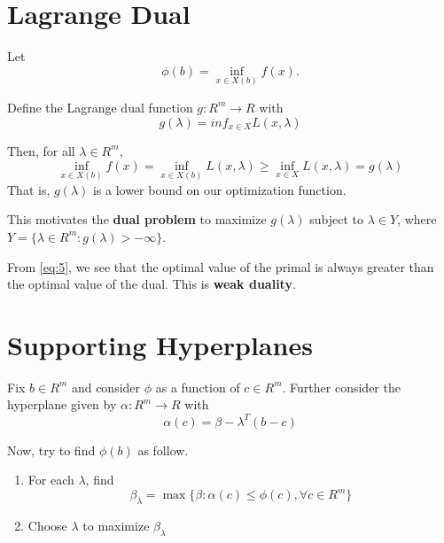 \section{Lagrange Dual}
\label{sec:lagrange-dual}

\begin{defn}
  \label{defn:3}

  Let
  \begin{equation}
    \label{eq:6}
    \phi(b) = \inf_{x \in X(b)} f(x).
  \end{equation}

  Define the Lagrange dual function $g: R^{m} \rightarrow R$ with
  \begin{equation}
    \label{eq:4}
    g(\lambda) = inf_{x \in X} L(x, \lambda)
  \end{equation}
  
  Then, for all $\lambda \in R^{m}$,
  \begin{equation}
    \label{eq:5}
    \inf_{x \in X(b)} f(x) = \inf_{x \in X(b)} L(x, \lambda) \geq
    \inf_{x \in X} L(x, \lambda) = g(\lambda)
  \end{equation} That is, $g(\lambda)$ is a lower bound on our
  optimization function.
\end{defn}

This motivates the \textbf{dual problem} to maximize $g(\lambda)$ subject to
$\lambda \in Y$, where $Y = \{ \lambda \in R^{m} : g(\lambda) >
-\infty \}$.

\begin{thm}[Duality]
  From \eqref{eq:5}, we see that the optimal value of the primal is
  always greater than the optimal value of the dual.  This is
  \textbf{weak duality}. 
\end{thm}

\section{Supporting Hyperplanes}
\label{sec:supp-hyperpl}


Fix $b \in R^{m}$ and consider $\phi$ as a function of $c \in R^{m}$.
Further consider the hyperplane given by $\alpha: R^{m} \rightarrow R$
with
\begin{equation}
  \label{eq:7}
  \alpha(c) = \beta - \lambda^{T}(b - c)
\end{equation}

Now, try to find $\phi(b)$ as follow.
\begin{enumerate}
\item For each $\lambda$, find
  \begin{equation}
    \label{eq:8}
    \beta_{\lambda} = \max \{ \beta: \alpha(c) \leq \phi(c), \forall c
    \in R^{m} \}
  \end{equation}
\item Choose $\lambda$ to maximize $\beta_{\lambda}$

\end{enumerate}

